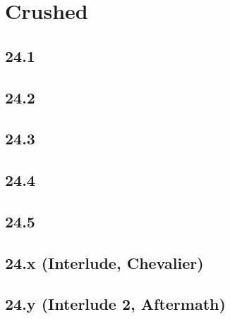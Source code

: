 \part{Crushed}
 \chapter{24.1}
 \chapter{24.2}
 \chapter{24.3}
 \chapter{24.4}
 \chapter{24.5}
 \chapter{24.x (Interlude, Chevalier)}
 \chapter{24.y (Interlude 2, Aftermath)}








